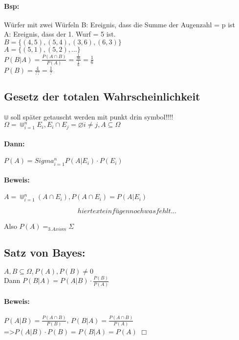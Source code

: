 \documentclass{article}
\begin{document}
\paragraph*{Bsp:} Würfer mit zwei Würfeln B: Ereignis, dass die Summe der Augenzahl = p ist \\ A: Ereignis, dass der 1. Wurf = 5 ist.\\ \(B = \{(4,5), (5,4), (3,6), (6,3)\}\)\\ \(A = \{(5,1), (5,2), ...\}\)\\ \(P(B \vert A) = \frac{P(A \cap B)}{P(A)} = \frac{\frac{1}{36}}{\frac{1}{6}} = \frac{1}{6}\)\\ \(P(B) = \frac{4}{??} = \frac{1}{?}\)

\subsection*{Gesetz der totalen Wahrscheinlichkeit} 

\(\Cup\) soll später getauscht werden mit punkt drin symbol!!!!\\

\(\Omega = \Cup^n_{i = 1} E_i, E_i \cap E_j = \varnothing i \not = j, A \subseteq \Omega\) 
\paragraph*{Dann:} \(P(A) = Sigma^n_{i = 1} P(A \vert E_i) \cdot P(E_i)\)

\paragraph*{Beweis:} \(A = \Cup^n_{i = 1} (A \cap E_i), P(A\cap E_i) = P(A \vert E_i)\)

\[hier text einfügen noch was fehlt...\]

Also \(P(A) =_{3. Axiom} \Sigma\)

\subsection*{Satz von Bayes:} \(A,B \subseteq \Omega, P(A), P(B) \not = 0\) \\ Dann \(P(B \vert A) = P(A \vert B) \cdot \frac{P(B)}{P(A)}\) 
\paragraph*{Beweis:} \(P(A \vert B) = \frac{P(A \cap B)}{P(B)}\), \(P(B \vert A) = \frac{P(A \cap B)}{P(A)}\) \\ =>\(P(A \vert B) \cdot P(B) = P(B \vert A) = P(A)\) \(\Box\)
\end{document}
